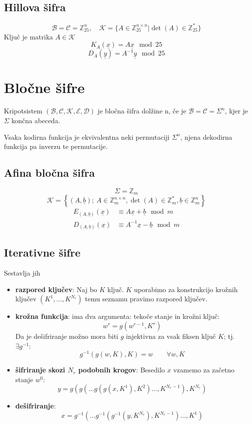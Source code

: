 \begin{multicols}{5}
\subsection*{Hillova šifra}
\[ \mathcal{B} = \mathcal{C} = \mathbb{Z}_{25}^n, \quad \mathcal{K} = \{ A \in \mathbb{Z}_{25}^{n\times n} | \det(A) \in \mathbb{Z}_{25}^* \}\]
Ključ je matrika $A \in \mathcal{K}$
\[ K_A(\underline{x}) = A \underline{x} \mod 25\]
\[ D_A(\underline{y}) = A^{-1} \underline{y} \mod 25\]

\section*{Bločne šifre}
Kripotsistem $(\mathcal{B}, \mathcal{C}, \mathcal{K}, \mathcal{E}, \mathcal{D})$ je bločna šifra dolžine n, 
če je $\mathcal{B} = \mathcal{C} = \Sigma^n$, kjer je $\Sigma$ končna abeceda.

Vsaka kodirna funkcija je ekvivalentna neki permutaciji $\Sigma^n$, njena dekodirna funkcija pa inverzu te permutacije.

\subsection*{Afina bločna šifra}
\[ \Sigma = \mathbb{Z}_m \]
\[ \mathcal{K} = \left\{ (A, \underline{b});\ A \in \mathbb{Z}_m^{n\times n}, \det(A) \in \mathbb{Z}_m^*, \underline{b} \in \mathbb{Z}^n_m \right\}  \]
\begin{align*}
	E_{(A, \underline{b})}(\underline{x}) &\equiv A \underline{x} + \underline{b} \mod m \\
	D_{(A, \underline{b})}(\underline{x}) &\equiv A^{-1} \underline{x} - \underline{b} \mod m 
\end{align*}

\subsection*{Iterativne šifre}
Sestavlja jih 

\begin{itemize}
	\item \textbf{razpored ključev}: Naj bo $K$ ključ. $K$ uporabimo za konstrukcijo krožnih ključev $(K^1,\dots, K^{N_r})$ temu seznamu pravimo razpored ključev.
	\item \textbf{krožna funkcija}: ima dva argumenta: tekoče stanje in krožni ključ:
	\[ w^r = g(w^{r-1}, K^{r}) \]
	Da je dešifriranje možno mora biti $g$ injektivna za vsak fiksen ključ $K$; tj. $\exists g^{-1}:$
	\[ g^{-1}(g(w, K), K) = w \qquad \forall w, K\]
	\item \textbf{šifriranje skozi $N_r$ podobnih krogov}: Besedilo $x$ vzamemo za začetno stanje $w^0$:
	\[ y = g(g(\dots g(g(x, K^1), K^2) \dots, K^{N_r - 1}), K^{N_r})\]
	\item \textbf{dešifriranje}:
	\[ x = g^{-1}(\dots g^{-1}(g^{-1}(y, K^{N_r}), K^{N_r - 1}) \dots, K^1)\]
\end{itemize}



\end{multicols}
